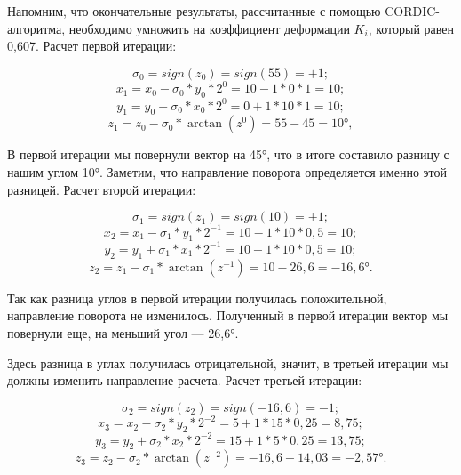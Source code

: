 \documentclass[a4paper,oneside ,10pt]{extreport}
\begin{document}
Напомним, что окончательные результаты, рассчитанные с помощью CORDIC-алгоритма, необходимо умножить на коэффициент 
деформации \(K_i\), который равен 0,607. Расчет первой итерации:

\begin{displaymath}	
\sigma_0 = sign(z_0) = sign(55) = + 1;
\end{displaymath}
\begin{displaymath}	
x_{1} = x_{0} - \sigma_0*y_0*2^{0} = 10 - 1*0*1 = 10;
\end{displaymath}
\begin{displaymath}
y_{1} = y_{0} + \sigma_0*x_0*2^{0} = 0 + 1*10*1 = 10;
\end{displaymath}
\begin{displaymath}	
z_{1} = z_{0} - \sigma_0*\arctan(z^{0}) = 55 - 45 = 10°,
\end{displaymath}

В первой итерации мы повернули вектор 
на 45°, что в итоге составило разницу с нашим углом 10°. Заметим, что направление поворота определяется именно этой разницей. Расчет второй итерации:

\begin{displaymath}	
\sigma_1 = sign(z_1) = sign(10) = + 1;
\end{displaymath}
\begin{displaymath}	
x_{2} = x_{1} - \sigma_1*y_1*2^{-1} = 10 - 1*10*0,5 = 10;
\end{displaymath}
\begin{displaymath}
y_{2} = y_{1} + \sigma_1*x_1*2^{-1} = 10 + 1*10*0,5 = 10;
\end{displaymath}
\begin{displaymath}	
z_{2} = z_{1} - \sigma_1*\arctan(z^{-1}) = 10 - 26,6 = -16,6°.
\end{displaymath}

Так как разница углов в первой итерации 
получилась положительной, направление 
поворота не изменилось. Полученный в первой итерации вектор мы повернули еще, 
на меньший угол — 26,6°.

Здесь разница в углах получилась отрицательной, значит, 
в третьей итерации мы должны изменить направление расчета.
Расчет третьей итерации:

\begin{displaymath}	
\sigma_2 = sign(z_2) = sign(-16,6) = - 1;
\end{displaymath}
\begin{displaymath}	
x_{3} = x_{2} - \sigma_2*y_2*2^{-2} = 5 + 1*15*0,25 = 8,75;
\end{displaymath}
\begin{displaymath}
y_{3} = y_{2} + \sigma_2*x_2*2^{-2} = 15 + 1*5*0,25 = 13,75;
\end{displaymath}
\begin{displaymath}	
z_{3} = z_{2} - \sigma_2*\arctan(z^{-2}) = -16,6 + 14,03 = -2,57°.
\end{displaymath}
\end{document}
